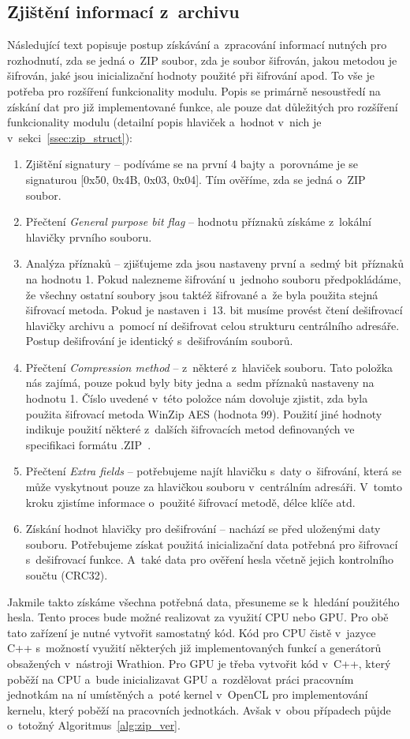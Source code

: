 \subsection{Zjištění informací z~archivu}
Následující text popisuje postup získávání a~zpracování informací nutných pro rozhodnutí, zda se
jedná o~ZIP soubor, zda je soubor šifrován, jakou metodou je šifrován, jaké jsou inicializační
hodnoty použité při šifrování apod. To vše je potřeba pro rozšíření funkcionality modulu. Popis se
primárně nesoustředí na získání dat pro již implementované funkce, ale pouze dat důležitých pro
rozšíření funkcionality modulu (detailní popis hlaviček a~hodnot v~nich je
v~sekci~\ref{ssec:zip_struct}):
\begin{enumerate}
    \item Zjištění signatury -- podíváme se na první 4 bajty a~porovnáme je se signaturou [0x50,
	0x4B, 0x03, 0x04]. Tím ověříme, zda se jedná o~ZIP soubor.
    \item Přečtení {\it General purpose bit flag} -- hodnotu příznaků získáme z~lokální hlavičky
	prvního souboru.
    \item Analýza příznaků -- zjišťujeme zda jsou nastaveny první a~sedmý bit příznaků na hodnotu
	1. Pokud nalezneme šifrování u~jednoho souboru předpokládáme, že všechny ostatní soubory
	jsou taktéž šifrované a~že byla použita stejná šifrovací metoda. Pokud je nastaven i~13.
	bit musíme provést čtení dešifrovací hlavičky archivu a~pomocí ní dešifrovat celou
	strukturu centrálního adresáře. Postup dešifrování je identický s~dešifrováním souborů.
    \item Přečtení {\it Compression method} -- z~některé z~hlaviček %
	souboru. Tato položka nás zajímá, pouze pokud byly bity jedna a~sedm příznaků nastaveny na
	hodnotu 1. Číslo uvedené v~této položce nám dovoluje zjistit, zda byla použita šifrovací
	metoda WinZip AES (hodnota 99). Použití jiné hodnoty indikuje použití některé z~dalších
	šifrovacích metod definovaných ve specifikaci formátu .ZIP~\cite{PKWARE:2014}.
    \item Přečtení {\it Extra fields} -- potřebujeme najít hlavičku s~daty o~šifrování, která se
	může vyskytnout pouze za hlavičkou souboru v~centrálním adresáři. V~tomto kroku zjistíme
	informace o~použité šifrovací metodě, délce klíče atd.
    \item Získání hodnot hlavičky pro dešifrování -- nachází se před uloženými daty souboru.
	Potřebujeme získat použitá inicializační data potřebná pro šifrovací s~dešifrovací funkce.
	A~také data pro ověření hesla včetně jejich kontrolního součtu (CRC32).
\end{enumerate}
Jakmile takto získáme všechna potřebná data, přesuneme se k~hledání použitého hesla. Tento proces
bude možné realizovat za využití CPU nebo GPU. Pro obě tato zařízení je nutné vytvořit samostatný
kód. Kód pro CPU čistě v~jazyce C++ s~možností využití některých již implementovaných funkcí a
generátorů obsažených v~nástroji Wrathion. Pro GPU je třeba vytvořit kód v~C++, který poběží na
CPU a~bude inicializavat GPU a~rozdělovat práci pracovním jednotkám na ní umístěných a~poté kernel
v~OpenCL pro implementování kernelu, který poběží na pracovních jednotkách. Avšak v~obou
případech půjde o~totožný Algoritmus~\ref{alg:zip_ver}.

